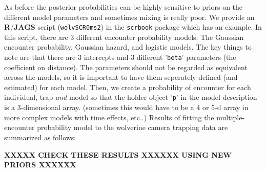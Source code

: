 As before the posterior probabilities can be highly sensitive to
priors on the different model parameters and sometimes mixing is
really poor.
We provide  an {\bf R}/{\bf JAGS} script 
(\mbox{\tt wolvSCR0ms2})
in the 
\mbox{\tt scrbook} package which has an example. 
In this script, there are 3 different 
encounter probability models:
 The Gaussian encounter probability,
 Gaussian hazard, and logistic models.
The key things to note are that there are 3 intercepts and 3 different
'\mbox{\tt beta}' parameters (the coefficient on distance). The
parameters should not be regarded as equivalent across the models, so
it is important to have them seperately defined (and estimated) for each
model. Then,  we create a probability of encounter for each
individual, trap {\it and} model so that the holder object '\mbox{\tt p}' in the
model description is a 3-dimensional array. (sometimes this would have to be a 4
or 5-d array in more complex models with time effects, etc..)
Results of fitting the multiple-encounter probability model to the
wolverine camera trapping data are summarized as follows:

{\bf XXXXX CHECK THESE RESULTS XXXXXX USING NEW PRIORS XXXXXX}

